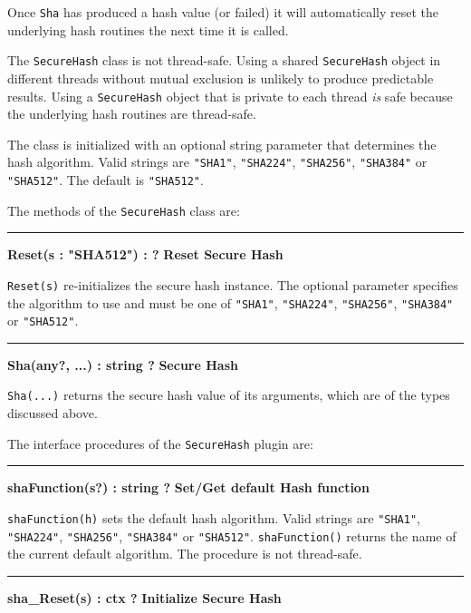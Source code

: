 Once \texttt{Sha} has produced a hash value (or failed) it will automatically
reset the underlying hash routines the next time it is called.

The \texttt{SecureHash} class is not thread-safe. \WarningNotThreadSafe
Using a shared \texttt{SecureHash} object in different threads without mutual
exclusion is unlikely to produce predictable results. Using a
\texttt{SecureHash} object that is private to each thread {\em is\/} safe
because the underlying hash routines are thread-safe.

The class is initialized with an optional string parameter that determines the
hash algorithm. Valid strings are \texttt{"SHA1"}, \texttt{"SHA224"},
\texttt{"SHA256"}, \texttt{"SHA384"} or \texttt{"SHA512"}.  The default is
\texttt{"SHA512"}.


The methods of the \texttt{SecureHash} class are:

\bigskip\hrule\vspace{0.1cm}
\noindent
{\bf Reset(s : "SHA512") : ? } \hfill {\bf Reset Secure Hash}

\noindent
{}\texttt{Reset(s)} re-initializes the secure hash instance.  The
optional parameter specifies the algorithm to use and must be one of \texttt{"SHA1"},
\texttt{"SHA224"}, \texttt{"SHA256"}, \texttt{"SHA384"} or \texttt{"SHA512"}.

\bigskip\hrule\vspace{0.1cm}
\noindent
{\bf Sha(any?, ...) : string ? } \hfill {\bf Secure Hash}

\noindent
{}\texttt{Sha(...)} returns the secure hash value of its
arguments, which are of the types discussed above.

\bigskip
The interface procedures of the \texttt{SecureHash} plugin are:

\bigskip\hrule\vspace{0.1cm}
\noindent
{\bf shaFunction(s?) : string ? } \hfill {\bf Set/Get default Hash function}

\noindent
{}
\texttt{shaFunction(h)} sets the default hash algorithm.  Valid strings are
\texttt{"SHA1"}, \texttt{"SHA224"}, \texttt{"SHA256"}, \texttt{"SHA384"} or
\texttt{"SHA512"}.  \texttt{shaFunction()} returns the name of the current
default algorithm.  The procedure is not thread-safe. \WarningNotThreadSafe

\bigskip\hrule\vspace{0.1cm}
\noindent
{\bf sha\_Reset(s) : ctx ? } \hfill {\bf Initialize Secure Hash}

